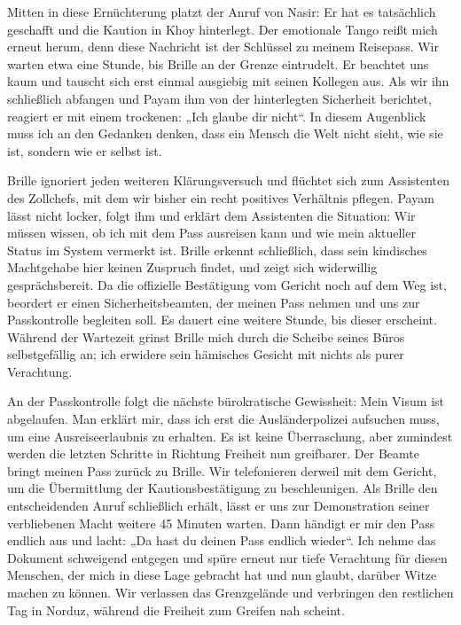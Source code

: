 Mitten in diese Ernüchterung platzt der Anruf von Nasir: Er hat es tatsächlich geschafft und die Kaution in Khoy hinterlegt. Der emotionale Tango reißt mich erneut herum, denn diese Nachricht ist der Schlüssel zu meinem Reisepass. Wir warten etwa eine Stunde, bis Brille an der Grenze eintrudelt. Er beachtet uns kaum und tauscht sich erst einmal ausgiebig mit seinen Kollegen aus. Als wir ihn schließlich abfangen und Payam ihm von der hinterlegten Sicherheit berichtet, reagiert er mit einem trockenen: „Ich glaube dir nicht“. In diesem Augenblick muss ich an den Gedanken denken, dass ein Mensch die Welt nicht sieht, wie sie ist, sondern wie er selbst ist.

Brille ignoriert jeden weiteren Klärungsversuch und flüchtet sich zum Assistenten des Zollchefs, mit dem wir bisher ein recht positives Verhältnis pflegen. Payam lässt nicht locker, folgt ihm und erklärt dem Assistenten die Situation: Wir müssen wissen, ob ich mit dem Pass ausreisen kann und wie mein aktueller Status im System vermerkt ist. Brille erkennt schließlich, dass sein kindisches Machtgehabe hier keinen Zuspruch findet, und zeigt sich widerwillig gesprächsbereit. Da die offizielle Bestätigung vom Gericht noch auf dem Weg ist, beordert er einen Sicherheitsbeamten, der meinen Pass nehmen und uns zur Passkontrolle begleiten soll. Es dauert eine weitere Stunde, bis dieser erscheint. Während der Wartezeit grinst Brille mich durch die Scheibe seines Büros selbstgefällig an; ich erwidere sein hämisches Gesicht mit nichts als purer Verachtung.

An der Passkontrolle folgt die nächste bürokratische Gewissheit: Mein Visum ist abgelaufen. Man erklärt mir, dass ich erst die Ausländerpolizei aufsuchen muss, um eine Ausreiseerlaubnis zu erhalten. Es ist keine Überraschung, aber zumindest werden die letzten Schritte in Richtung Freiheit nun greifbarer. Der Beamte bringt meinen Pass zurück zu Brille. Wir telefonieren derweil mit dem Gericht, um die Übermittlung der Kautionsbestätigung zu beschleunigen. Als Brille den entscheidenden Anruf schließlich erhält, lässt er uns zur Demonstration seiner verbliebenen Macht weitere 45 Minuten warten. Dann händigt er mir den Pass endlich aus und lacht: „Da hast du deinen Pass endlich wieder“. Ich nehme das Dokument schweigend entgegen und spüre erneut nur tiefe Verachtung für diesen Menschen, der mich in diese Lage gebracht hat und nun glaubt, darüber Witze machen zu können. Wir verlassen das Grenzgelände und verbringen den restlichen Tag in Norduz, während die Freiheit zum Greifen nah scheint.

